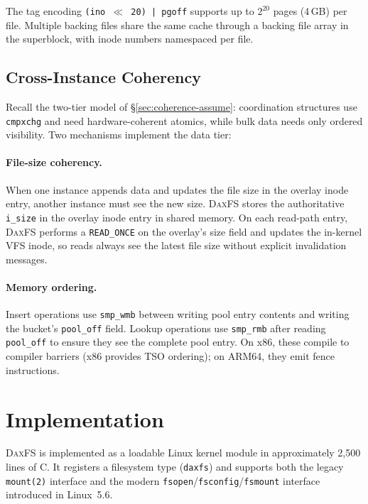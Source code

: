 \documentclass[letterpaper,twocolumn,10pt]{article}
\newcommand{\daxfs}{\textsc{DaxFS}\xspace}
\begin{document}
The tag encoding \texttt{(ino $\ll$ 20) | pgoff} supports up to
$2^{20}$ pages (4\,GB) per file.  Multiple backing files share the
same cache through a backing file array in the superblock, with inode
numbers namespaced per file.

\subsection{Cross-Instance Coherency}
\label{sec:coherency}

Recall the two-tier model of \S\ref{sec:coherence-assume}: coordination
structures use \texttt{cmpxchg} and need hardware-coherent atomics,
while bulk data needs only ordered visibility.  Two mechanisms
implement the data tier:

\paragraph{File-size coherency.}
When one instance appends data and updates the file size in the overlay
inode entry, another instance must see the new size.  \daxfs stores the
authoritative \texttt{i\_size} in the overlay inode entry in shared
memory.  On each read-path entry, \daxfs performs a \texttt{READ\_ONCE}
on the overlay's size field and updates the in-kernel VFS inode, so
reads always see the latest file size without explicit invalidation
messages.

\paragraph{Memory ordering.}
Insert operations use \texttt{smp\_wmb} between writing pool entry
contents and writing the bucket's \texttt{pool\_off} field.
Lookup operations use \texttt{smp\_rmb} after reading
\texttt{pool\_off} to ensure they see the complete pool entry.
On x86, these compile to compiler barriers (x86 provides TSO
ordering); on ARM64, they emit fence instructions.

\section{Implementation}
\label{sec:impl}

\daxfs is implemented as a loadable Linux kernel module in
approximately 2,500 lines of C.  It registers a filesystem type
(\texttt{daxfs}) and supports both the legacy \texttt{mount(2)}
interface and the modern \texttt{fsopen}/\texttt{fsconfig}/\texttt{fsmount}
interface introduced in Linux~5.6.
\end{document}
